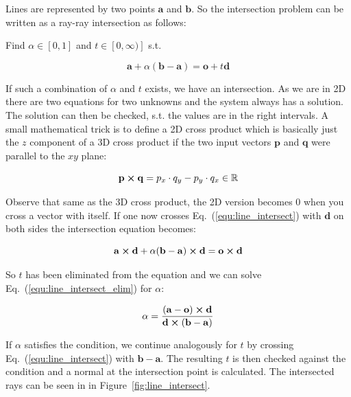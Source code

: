 \documentclass[a4paper,10pt]{article}
\renewcommand{\vec}[1]{\mathbf{#1}}
\newcommand{\equref}[1]{Eq.~(\ref{#1})}
\newcommand{\figref}[1]{Figure~\ref{#1}}
\begin{document}
    Lines are represented by two points $\vec{a}$ and $\vec{b}$.
    So the intersection problem can be written as a ray-ray intersection
    as follows:

    Find $\alpha \in [0,1]$ and $t \in [0, \infty)]$ s.t. 

    \begin{equation}
        \label{equ:line_intersect}
        \vec{a} + \alpha (\vec{b} - \vec{a}) = \vec{o} + t \vec{d}
    \end{equation}

    If such a combination of $\alpha$ and $t$ exists, we have an intersection.
    As we are in 2D there are two equations for two unknowns and the
    system always has a solution.
    The solution can then be checked, s.t. the values are in the right
    intervals.
    A small mathematical trick is to define a 2D cross product which
    is basically just the $z$ component of a 3D cross product if the
    two input vectors $\vec{p}$ and $\vec{q}$ were parallel to the
    $xy$ plane:
    
    \begin{equation}
        \label{equ:2d_cross}
        \vec{p} \cross \vec{q} = 
        p_x \cdot q_y - p_y \cdot q_x \in \mathbb{R}
    \end{equation}

    Observe that same as the 3D cross product, the 2D version becomes 0
    when you cross a vector with itself.
    If one now crosses \equref{equ:line_intersect} with $\vec{d}$ on
    both sides the intersection equation becomes:
    
    \begin{equation}
        \label{equ:line_intersect_elim}
        \vec{a} \cross \vec{d} + \alpha (\vec{b} - \vec{a}) \cross \vec{d} =
        \vec{o} \cross \vec{d}
    \end{equation}

    So $t$ has been eliminated from the equation and we can solve 
    \equref{equ:line_intersect_elim} for $\alpha$:

    \begin{equation}
        \label{equ:line_intersect_alpha}
        \alpha = \frac{(\vec{a} - \vec{o}) \cross \vec{d}}
                      {\vec{d} \cross (\vec{b} - \vec{a})}
    \end{equation}

    If $\alpha$ satisfies the condition, we continue analogously for
    $t$ by crossing \equref{equ:line_intersect} with $\vec{b} - \vec{a}$.
    The resulting $t$ is then checked against the condition and
    a normal at the intersection point is calculated.
    The intersected rays can be seen in in \figref{fig:line_intersect}.
\end{document}
